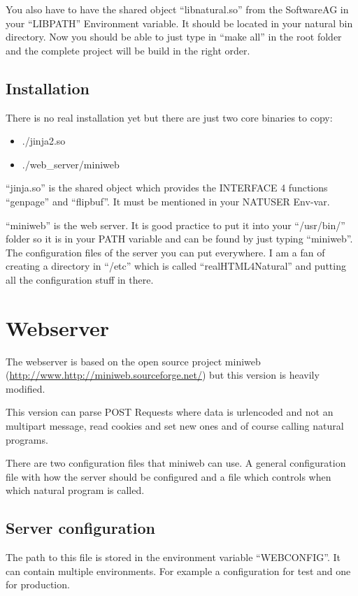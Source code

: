 \documentclass[letterpaper,10pt,english]{sphinxmanual}
\begin{document}
You also have to have the shared object ``libnatural.so'' from the SoftwareAG in your ``LIBPATH'' Environment variable. It should be located in your natural bin directory.
Now you should be able to just type in ``make all'' in the root folder and the complete project will be build in the right order.


\subsection{Installation}
\label{installation:installation}
There is no real installation yet but there are just two core binaries to copy:
\begin{itemize}
\item {} 
./jinja2.so

\item {} 
./web\_server/miniweb

\end{itemize}

``jinja.so'' is the shared object which provides the INTERFACE 4 functions ``genpage'' and ``flipbuf''. It must be mentioned in your NATUSER Env-var.

``miniweb'' is the web server. It is good practice to put it into your ``/usr/bin/'' folder so it is in your PATH variable and can be found by just typing ``miniweb''. The configuration files of the server you can put everywhere.
I am a fan of creating a directory in ``/etc'' which is called ``realHTML4Natural'' and putting all the configuration stuff in there.


\section{Webserver}
\label{webserver:webserver}\label{webserver::doc}
The webserver is based on the open source project miniweb (\url{http://www.http://miniweb.sourceforge.net/}) but this version is heavily modified.

This version can parse POST Requests where data is urlencoded and not an multipart message, read cookies and set new ones and of course calling natural programs.

There are two configuration files that miniweb can use. A general configuration file with how the server should be configured and a file which controls when which natural program is called.


\subsection{Server configuration}
\label{webserver:server-configuration}\label{webserver:webserver-config}
The path to this file is stored in the environment variable ``WEBCONFIG''. It can contain multiple environments. For example a configuration for test and one for production.
\end{document}
